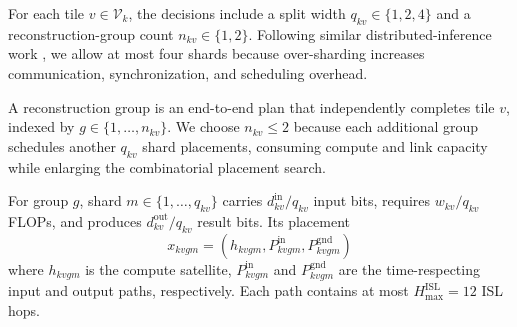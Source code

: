 \documentclass[conference]{IEEEtran}
\begin{document}
For each tile $v\in\mathcal{V}_k$, the decisions include a split width
$q_{kv}\in\{1,2,4\}$ and a reconstruction-group count
$n_{kv}\in\{1,2\}$. Following similar distributed-inference work
\cite{zhao2018deepthings,tang2022partitioning}, we allow at most four shards
because over-sharding increases communication, synchronization, and scheduling
overhead.

A reconstruction group is an end-to-end plan that independently completes tile
$v$, indexed by $g\in\{1,\ldots,n_{kv}\}$. We choose $n_{kv}\le2$ because
each additional group schedules another $q_{kv}$ shard placements, consuming
compute and link capacity while enlarging the combinatorial placement search.

For group $g$, shard $m\in\{1,\ldots,q_{kv}\}$ carries
$d^{\mathrm{in}}_{kv}/q_{kv}$ input bits, requires $w_{kv}/q_{kv}$ FLOPs, and
produces $d^{\mathrm{out}}_{kv}/q_{kv}$ result bits. Its placement
\begin{equation}
 x_{kvgm}=(h_{kvgm},P^{\mathrm{in}}_{kvgm},
 P^{\mathrm{gnd}}_{kvgm})
\label{eq:placement}
\end{equation}
where $h_{kvgm}$ is the compute satellite,
$P^{\mathrm{in}}_{kvgm}$ and $P^{\mathrm{gnd}}_{kvgm}$ are the
time-respecting input and output paths, respectively. Each path contains at
most $H_{\max}^{\mathrm{ISL}}=12$ ISL hops.
\end{document}
